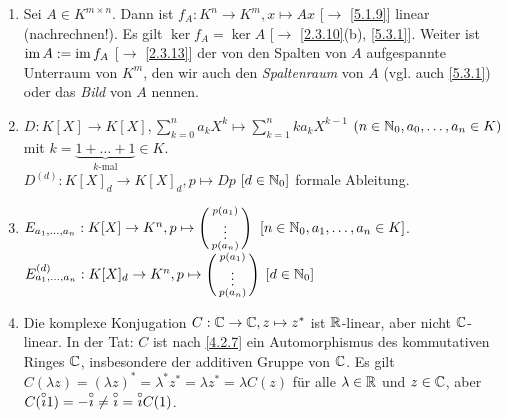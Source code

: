 \documentclass[../../main.tex]{subfiles}
\begin{document}
\begin{bsp}
\begin{enumerate}[\normalfont(a)]
\begin{center}
\end{center}
\item Sei $A\in K^{m\times n}$. Dann ist $f_A: K^n\to K^m, x\mapsto Ax$ [$\to$ \ref{5.1.9}] linear (nachrechnen!). Es gilt $\ker f_A = \ker A$ [$\to$ \ref{2.3.10}(b), \ref{5.3.1}]. Weiter ist $\operatorname{im} A :=\operatorname{im} f_A$ [$\to$ \ref{2.3.13}] der von den Spalten von $A$ aufgespannte Unterraum von $K^m$, den wir auch den \emph{Spaltenraum} von $A$ (vgl. auch \ref{5.3.1}) oder das \emph{Bild} von $A$ nennen.
\item $D:K[X]\to K[X], \sum_{k=0}^{n}a_kX^k\mapsto\sum_{k=1}^{n}k a_k X^{k-1}$ $(n\in \mathbb N_0, a_0,\ldots,a_n\in K)$ mit $k=\underbrace{1+\ldots+1}_{k\text{-mal}}\in K$.\\
$D^{(d)}:K[X]_d\to K[X]_d, p\mapsto Dp$ $[d\in \mathbb N_0]$ formale Ableitung.
\item $E_{a_1,\ldots,a_n}: K[X]\to K^n, p\mapsto \left(\begin{smallmatrix}p(a_1)\\\vdots\\p(a_n)\end{smallmatrix}\right)$ $[n\in\mathbb N_0, a_1,\ldots,a_n\in K]$.\\
$E_{a_1,\ldots,a_n}^{(d)}:K[X]_d\to K^n, p\mapsto\left(\begin{smallmatrix}p(a_1)\\\vdots\\p(a_n)\end{smallmatrix}\right)$ $[d\in\mathbb N_0]$
\item Die komplexe Konjugation $C:\mathbb C\to \mathbb C, z\mapsto z^*$ ist $\mathbb R$-linear, aber nicht $\mathbb C$-linear. In der Tat: $C$ ist nach \ref{4.2.7} ein Automorphismus des kommutativen Ringes $\mathbb C$, insbesondere der additiven Gruppe von $\mathbb C$. Es gilt $C(\lambda z)=(\lambda z)^* = \lambda^*z^* =\lambda z^* = \lambda C(z)$ für alle $\lambda\in \mathbb R$ und $z\in \mathbb C$, aber $C(\overset\circ\imath 1)=-\overset\circ\imath\ne \overset\circ\imath = \overset\circ\imath C(1)$.
\end{enumerate}
\end{bsp}
\end{document}
